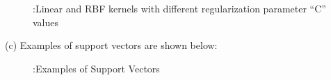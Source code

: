\documentclass[10pt]{article}
\begin{document}
\begin{flushleft}
\begin{figure}[!htp]
	\caption{:Linear and RBF kernels with different regularization parameter ``C'' values}
	\label{fig: Linear and RBF kernels with different regularization parameter ``C'' values}
\end{figure}
\vspace{0.5em}
(c) Examples of support vectors are shown below:\\
\begin{figure}[!htp]
	\caption{:Examples of Support Vectors}
	\label{fig: Examples of Support Vectors}
\end{figure}
\end{flushleft}
\end{document}
